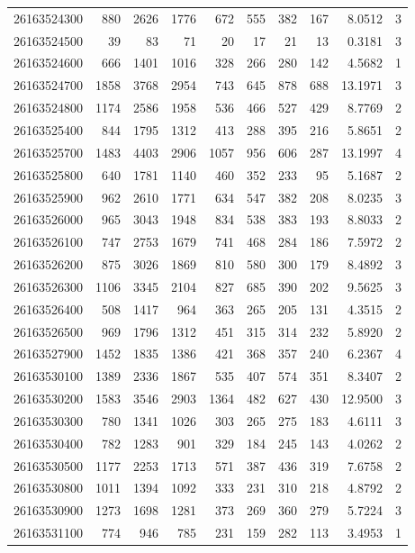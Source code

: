 \documentclass[
  11pt,
]{article}
\begin{document}
\begin{longtable}[t]{lrrrrrrrrr}
26163524300 & 880 & 2626 & 1776 & 672 & 555 & 382 & 167 & 8.0512 & 3\\
26163524500 & 39 & 83 & 71 & 20 & 17 & 21 & 13 & 0.3181 & 3\\
26163524600 & 666 & 1401 & 1016 & 328 & 266 & 280 & 142 & 4.5682 & 1\\
26163524700 & 1858 & 3768 & 2954 & 743 & 645 & 878 & 688 & 13.1971 & 3\\
26163524800 & 1174 & 2586 & 1958 & 536 & 466 & 527 & 429 & 8.7769 & 2\\
26163525400 & 844 & 1795 & 1312 & 413 & 288 & 395 & 216 & 5.8651 & 2\\
26163525700 & 1483 & 4403 & 2906 & 1057 & 956 & 606 & 287 & 13.1997 & 4\\
26163525800 & 640 & 1781 & 1140 & 460 & 352 & 233 & 95 & 5.1687 & 2\\
26163525900 & 962 & 2610 & 1771 & 634 & 547 & 382 & 208 & 8.0235 & 3\\
26163526000 & 965 & 3043 & 1948 & 834 & 538 & 383 & 193 & 8.8033 & 2\\
26163526100 & 747 & 2753 & 1679 & 741 & 468 & 284 & 186 & 7.5972 & 2\\
26163526200 & 875 & 3026 & 1869 & 810 & 580 & 300 & 179 & 8.4892 & 3\\
26163526300 & 1106 & 3345 & 2104 & 827 & 685 & 390 & 202 & 9.5625 & 3\\
26163526400 & 508 & 1417 & 964 & 363 & 265 & 205 & 131 & 4.3515 & 2\\
26163526500 & 969 & 1796 & 1312 & 451 & 315 & 314 & 232 & 5.8920 & 2\\
26163527900 & 1452 & 1835 & 1386 & 421 & 368 & 357 & 240 & 6.2367 & 4\\
26163530100 & 1389 & 2336 & 1867 & 535 & 407 & 574 & 351 & 8.3407 & 2\\
26163530200 & 1583 & 3546 & 2903 & 1364 & 482 & 627 & 430 & 12.9500 & 3\\
26163530300 & 780 & 1341 & 1026 & 303 & 265 & 275 & 183 & 4.6111 & 3\\
26163530400 & 782 & 1283 & 901 & 329 & 184 & 245 & 143 & 4.0262 & 2\\
26163530500 & 1177 & 2253 & 1713 & 571 & 387 & 436 & 319 & 7.6758 & 2\\
26163530800 & 1011 & 1394 & 1092 & 333 & 231 & 310 & 218 & 4.8792 & 2\\
26163530900 & 1273 & 1698 & 1281 & 373 & 269 & 360 & 279 & 5.7224 & 3\\
26163531100 & 774 & 946 & 785 & 231 & 159 & 282 & 113 & 3.4953 & 1\\

\end{longtable}
\end{document}
